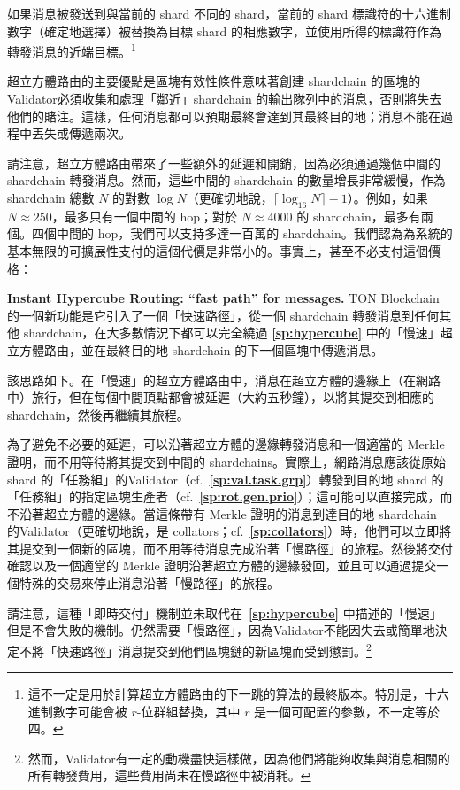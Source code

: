 \documentclass[12pt,oneside]{article}
\def\makepoint#1{\medbreak\noindent{\bf #1.\ }}
\def\nxsubpoint{\refstepcounter{subsubsection}%
  \smallbreak\makepoint{\thesubsubsection}}
\def\refpoint#1{{\rm\textbf{\ref{#1}}}}
\let\ptref=\refpoint
\def\embt(#1.){\textbf{#1.}}
\begin{document}
如果消息被發送到與當前的 shard 不同的 shard，當前的 shard 標識符的十六進制數字（確定地選擇）被替換為目標 shard 的相應數字，並使用所得的標識符作為轉發消息的近端目標。\footnote{這不一定是用於計算超立方體路由的下一跳的算法的最終版本。特別是，十六進制數字可能會被 $r$-位群組替換，其中 $r$ 是一個可配置的參數，不一定等於四。}

超立方體路由的主要優點是區塊有效性條件意味著創建 shardchain 的區塊的Validator必須收集和處理「鄰近」shardchain 的輸出隊列中的消息，否則將失去他們的賭注。這樣，任何消息都可以預期最終會達到其最終目的地；消息不能在過程中丟失或傳遞兩次。

請注意，超立方體路由帶來了一些額外的延遲和開銷，因為必須通過幾個中間的 shardchain 轉發消息。然而，這些中間的 shardchain 的數量增長非常緩慢，作為 shardchain 總數 $N$ 的對數 $\log N$（更確切地說，$\lceil\log_{16}N\rceil-1$）。例如，如果 $N\approx250$，最多只有一個中間的 hop；對於 $N\approx4000$ 的 shardchain，最多有兩個。四個中間的 hop，我們可以支持多達一百萬的 shardchain。我們認為為系統的基本無限的可擴展性支付的這個代價是非常小的。事實上，甚至不必支付這個價格：

\nxsubpoint\label{sp:instant.hypercube} \embt(Instant Hypercube
Routing: ``fast path'' for messages.) TON Blockchain 的一個新功能是它引入了一個「快速路徑」，從一個 shardchain 轉發消息到任何其他 shardchain，在大多數情況下都可以完全繞過 \ptref{sp:hypercube} 中的「慢速」超立方體路由，並在最終目的地 shardchain 的下一個區塊中傳遞消息。

該思路如下。在「慢速」的超立方體路由中，消息在超立方體的邊緣上（在網路中）旅行，但在每個中間頂點都會被延遲（大約五秒鐘），以將其提交到相應的 shardchain，然後再繼續其旅程。

為了避免不必要的延遲，可以沿著超立方體的邊緣轉發消息和一個適當的 Merkle 證明，而不用等待將其提交到中間的 shardchains。實際上，網路消息應該從原始 shard 的「任務組」的Validator（cf.~\ptref{sp:val.task.grp}）轉發到目的地 shard 的「任務組」的指定區塊生產者（cf.~\ptref{sp:rot.gen.prio}）；這可能可以直接完成，而不沿著超立方體的邊緣。當這條帶有 Merkle 證明的消息到達目的地 shardchain 的Validator（更確切地說，是 collators；cf.~\ptref{sp:collators}）時，他們可以立即將其提交到一個新的區塊，而不用等待消息完成沿著「慢路徑」的旅程。然後將交付確認以及一個適當的 Merkle 證明沿著超立方體的邊緣發回，並且可以通過提交一個特殊的交易來停止消息沿著「慢路徑」的旅程。

請注意，這種「即時交付」機制並未取代在~\ptref{sp:hypercube} 中描述的「慢速」但是不會失敗的機制。仍然需要「慢路徑」，因為Validator不能因失去或簡單地決定不將「快速路徑」消息提交到他們區塊鏈的新區塊而受到懲罰。\footnote{然而，Validator有一定的動機盡快這樣做，因為他們將能夠收集與消息相關的所有轉發費用，這些費用尚未在慢路徑中被消耗。}
\end{document}
